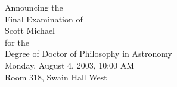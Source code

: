 \documentclass[letterpaper,11pt]{article}
\begin{document}
\pagestyle{empty}

\begin{spacing}{1.1}
\begin{center}
Announcing the \\
Final Examination of \\
Scott Michael \\
for the \\
Degree of Doctor of Philosophy in Astronomy \\
Monday, August 4, 2003, 10:00 AM \\
Room 318, Swain Hall West
\end{center}
\end{spacing}
\end{document}
